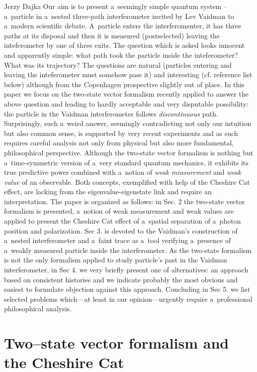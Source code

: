 \begin{artengenv}{Jerzy Dajka}
Our aim is to present a~seemingly simple quantum system -- a~particle in a~nested three-path interferometer invited by Lev Vaidman to a~modern scientific debate. A~particle enters the interferomenter, it has three paths at its disposal and then it is measured (postselected) leaving the inteferometer by one of three exits. The question which is asked looks innocent and apparently simple: what path took the particle inside the inteferometer? What was its trajectory? The questions are natural (particles entering and leaving the inteferometer must somehow pass it) and interesting (cf. reference list below) although  from the Copenhagen prospective slightly out of place.  In this paper we focus on  the two-state vector formalism recently applied to answer the above question and leading to hardly acceptable and very disputable possibility: the particle in the Vaidman interferometer follows {\it discontinuous}  path. Surprisingly, such a~weird answer, seemingly contradicting not only our intuition but also common sense,  is supported by very recent experiments and as such requires careful analysis not only from physical but also more fundamental, philosophical perspective. Although the two-state vector formalism is nothing but a~time-symmetric version of a~very standard quantum mechanics, it exhibits its true predictive power combined with a~notion of {\it weak measurement} and {\it weak value} of an observable. Both concepts, exemplified with help of the Cheshire Cat effect, are lacking from the eigenvalue-eigenstate link and require an interpretation.  The paper is organized as follows: in Sec. 2 the two-state vector formalism is presented, a~notion of weak measurement and weak values are applied to present the Cheshire Cat effect of a~spatial separation of a~photon position and polarization. Sec 3. is devoted to the Vaidman's construction of a~nested  interferometer and a~faint trace  as a~tool verifying a~presence of a~weakly measured particle inside the interferometer. As  the two-state formalism is not the only formalism applied to study particle's past in the Vaidman interferometer,    in Sec 4. we very briefly present one of  alternatives: an approach based on consistent histories and we indicate probably the  most obvious and easiest to formulate objection against this approach. Concluding in Sec 5. we list selected problems which---at least in our opinion---urgently require a~professional philosophical analysis. 

\section{Two--state vector formalism and the Cheshire Cat}


\end{artengenv}
